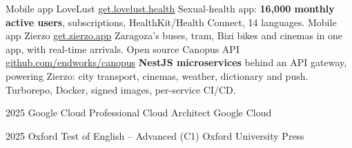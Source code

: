 \documentclass[9pt]{developercv} %
\begin{document}


\begin{entrylist}
	\entry
		{Mobile app}
		{LoveLust}
		{\href{https://get.lovelust.health}{get.lovelust.health}}
		{Sexual-health app: \textbf{16,000 monthly active users}, subscriptions, HealthKit/Health Connect, 14 languages.}
	\entry
		{Mobile app}
		{Zierzo}
		{\href{https://get.zierzo.app}{get.zierzo.app}}
		{Zaragoza's buses, tram, Bizi bikes and cinemas in one app, with real-time arrivals.}
	\entry
		{Open source}
		{Canopus API}
		{\href{https://github.com/endworks/canopus}{github.com/endworks/canopus}}
		{\textbf{NestJS microservices} behind an API gateway, powering Zierzo: city transport, cinemas, weather, dictionary and push. Turborepo, Docker, signed images, per-service CI/CD.}
\end{entrylist}


%

\begin{entrylist}
	\shortentry
		{2025}
		{Google Cloud Professional Cloud Architect}
		{Google Cloud}
		{}

	\shortentry
		{2025}
		{Oxford Test of English -- Advanced (C1)}
		{Oxford University Press}
		{}
\end{entrylist}


\end{document}
